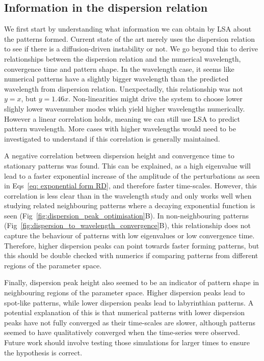 \subsection*{Information in the dispersion relation}
We first start by understanding what information we can obtain by LSA about the patterns formed.
Current state of the art merely uses the dispersion relation to see if there is a diffusion-driven instability or not.
We go beyond this to derive relationships between the dispersion relation and the numerical wavelength, convergence time and pattern shape.
In the wavelength case, it seems like numerical patterns have a slightly bigger wavelength than the predicted wavelength from dispersion relation.
Unexpectadly, this relationship was not $y=x$, but $y=1.46x$.
Non-linearities might drive the system to choose lower slighly lower wavenumber modes which yield higher wavelengths numerically.
However a linear correlation holds, meaning we can still use LSA to predict pattern wavelength.
More cases with higher wavelengths would need to be investigated to understand if this correlation is generally maintained.

A negative correlation between dispersion height and convergence time to stationary patterns was found.
This can be explained, as a high eigenvalue will lead to a faster exponential increase of the amplitude of the perturbations as seen in Eqs~\ref{eq: exponential form RD}, and therefore faster time-scales.
However, this correlation is less clear than in the wavelength study and only works well when studying related neighbouring patterns where a decaying exponential function is seen (Fig~\ref{fig:dispersion_peak_optimisation}B).
In non-neighbouring patterns (Fig~\ref{fig:dispersion_to_wavelength_convergence}B), this relationship does not capture the behaviour of patterns with low eigenvalues or low convergence time.
Therefore, higher dispersion peaks can point towards faster forming patterns, but this should be double checked with numerics if comparing patterns from different regions of the parameter space.

Finally, dispersion peak height also seemed to be an indicator of pattern shape in neighbouring regions of the parameter space.
Higher dispersion peaks lead to spot-like patterns, while lower dispersion peaks lead to labyrinthian patterns.
A potential explanation of this is that numerical patterns with lower dispersion peaks have not fully converged as their time-scales are slower, although patterns seemed to have qualitatively converged when the time-series were observed.
Future work should involve testing those simulations for larger times to ensure the hypothesis is correct.



